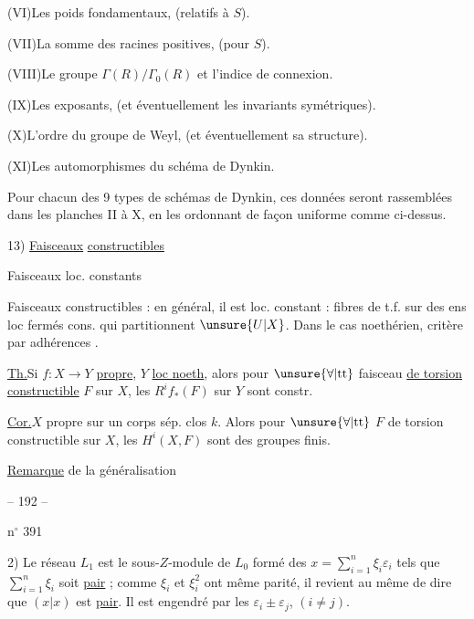 (VI)\quad Les poids fondamentaux, (relatifs à $S$).

(VII)\quad La somme des racines positives, (pour $S$).

(VIII)\quad Le groupe $\Gamma(R)/\Gamma_0(R)$ et l'indice de connexion.

(IX)\quad Les exposants, (et éventuellement les invariants symétriques).

(X)\quad L'ordre du groupe de Weyl, (et éventuellement sa structure).

(XI)\quad Les automorphismes du schéma de Dynkin.

Pour chacun des 9 types de schémas de Dynkin, ces données seront rassemblées
dans les planches II à X, en les ordonnant de façon uniforme comme ci-dessus.



\deleted{ouverte, et $\bar f$ propre. Ex] morphisme
quasi-projectif sur $Y$ loc. noeth.}

13) \uline{Faisceaux} \uline{constructibles}

Faisceaux loc.  constants

Faisceaux constructibles : en général, il est
loc. constant : fibres  de t.f.
sur des ens loc fermés cons. qui partitionnent
$\unsure{U|X}$. Dans le cas noethérien, critère
par adhérences   .

\uline{Th.}\quad Si $f:X\longrightarrow Y$ \uline{propre}, $Y$ \uline{loc noeth},
alors pour $\unsure{\forall|\text{tt}}$ faisceau \uline{de torsion}
\uline{constructible} $F$ sur $X$, les $R^i f_*(F)$
sur $Y$ sont constr.

\uline{Cor.}\quad $X$ propre sur un corps sép. clos
$k$. Alors pour $\unsure{\forall|\text{tt}}$ $F$ de torsion
constructible sur $X$, les $H^i(X,F)$ sont
des groupes finis.

\uline{Remarque}\quad {} de la généralisation



\begin{center}-- 192 --\end{center}
\hfill n$^{\circ}$ 391

2) Le réseau $L_1$ est le sous-$Z$-module de $L_0$ formé des $x=\sum_{i=1}^n\xi_i\varepsilon_i$ tels que
$\sum_{i=1}^n\xi_i$ soit \uline{pair} ; comme $\xi_i$ et $\xi_i^2$ ont même parité, il revient au même de dire
que $(x|x)$ est \uline{pair}. Il est engendré par les $\varepsilon_i\pm\varepsilon_j$, $(i\ne j)$.

